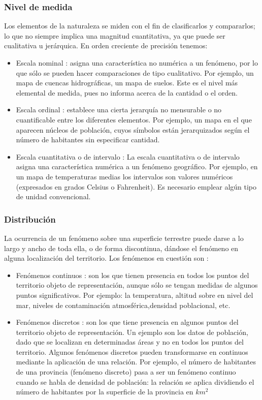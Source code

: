 \subsubsection{Nivel de medida}
Los elementos de la naturaleza se miden con el fin de clasificarlos y compararlos; lo que no siempre implica una
magnitud cuantitativa, ya que puede ser cualitativa u jerárquica. En orden creciente de precisión tenemos:
\begin{itemize}
    \item Escala nominal : asigna una característica no numérica a un fenómeno, por lo que sólo se pueden hacer 
    comparaciones de tipo cualitativo. Por ejemplo, un mapa de cuencas hidrográficas, un mapa de suelos. 
    Este es el nivel más elemental de medida, pues no informa acerca de la cantidad o el orden.
    
    \item Escala ordinal : establece una cierta jerarquía no mensurable o no cuantificable entre los diferentes
    elementos. Por ejemplo, un mapa en el que aparecen núcleos de población, cuyos símbolos están jerarquizados
    según el número de habitantes sin especificar cantidad.
    
    \item Escala cuantitativa o de intervalo : La escala cuantitativa o de intervalo asigna una característica 
    numérica a un fenómeno geográfico. Por ejemplo, en un mapa de temperaturas medias los intervalos son valores 
    numéricos (expresados en grados Celsius o Fahrenheit). Es necesario emplear algún tipo de unidad convencional.
\end{itemize}

\subsubsection{Distribución}
La ocurrencia de un fenómeno sobre una superficie terrestre puede darse a lo largo y ancho de toda ella, o de
forma discontinua, dándose el fenómeno en alguna localización del territorio. Los fenómenos en cuestión son :

\begin{itemize}
    \item Fenómenos continuos :  son los que tienen presencia en todos los puntos del territorio objeto de 
    representación, aunque sólo se tengan medidas de algunos puntos significativos. Por ejemplo: la temperatura,
    altitud sobre en nivel del mar, niveles de contaminación atmosférica,densidad poblacional, etc.
    
    \item Fenómenos discretos : son los que tiene presencia en algunos puntos del territorio objeto de 
    representación. Un ejemplo son los datos de población, dado que se localizan en determinadas áreas y 
    no en todos los puntos del territorio. Algunos fenómenos discretos pueden transformarse en continuos mediante 
    la aplicación de una relación. Por ejemplo, el número de habitantes de una provincia (fenómeno discreto) pasa
    a ser un fenómeno continuo cuando se habla de densidad de población: la relación se aplica dividiendo el
    número de habitantes por la superficie de la provincia en $km^2$
\end{itemize}
